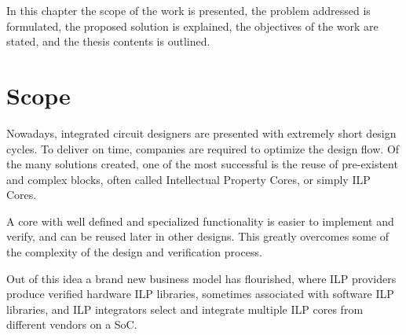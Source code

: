 \documentclass[defaultstyle,10pt,master,Helvetica]{thesis}
\begin{document}
\listoftables
\cleardoublepage




\cleardoublepage

\setcounter{page}{1} 
\baselineskip 18pt

\acresetall

In this chapter the scope of the work is presented, the problem addressed is formulated, the proposed solution is explained, the objectives of the work are stated, and the thesis contents is outlined.


\section{Scope}

Nowadays, integrated circuit designers are presented with extremely short design cycles. To deliver on time, companies are required to optimize the design flow. Of the many solutions created, one of the most successful is the reuse of pre-existent and complex blocks, often called Intellectual Property Cores, or simply \acs{ILP} Cores.

A core with well defined and specialized functionality is easier to implement and verify, and can be reused later in other designs. This greatly overcomes some of the complexity of the design and verification process.

Out of this idea a brand new business model has flourished, where \acs{ILP} providers produce verified hardware \acs{ILP} libraries, sometimes associated with software \acs{ILP} libraries, and \acs{ILP} integrators select and integrate multiple \acs{ILP} cores from different vendors on a \ac{SoC}.
\end{document}
